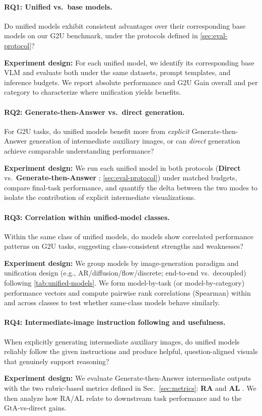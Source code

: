 \documentclass{article}
\theoremstyle{plain}
\theoremstyle{definition}
\theoremstyle{remark}
\begin{document}
\paragraph{RQ1: Unified vs.\ base models.}
Do unified models exhibit consistent advantages over their corresponding base models on our G2U benchmark, under the protocols defined in \cref{sec:eval-protocol}?
\par\noindent\textbf{Experiment design:} For each unified model, we identify its corresponding base VLM and evaluate both under the same datasets, prompt templates, and inference budgets. We report absolute performance and G2U Gain overall and per category to characterize where unification yields benefits.

\paragraph{RQ2: Generate-then-Answer  vs.\ direct generation.}
For G2U tasks, do unified models benefit more from \emph{explicit} Generate-then-Answer  generation of intermediate auxiliary images, or can \emph{direct} generation achieve comparable understanding performance?
\par\noindent\textbf{Experiment design:} We run each unified model in both protocols (\textbf{Direct} vs.\ \textbf{Generate-then-Answer }; \cref{sec:eval-protocol}) under matched budgets, compare final-task performance, and quantify the delta between the two modes to isolate the contribution of explicit intermediate visualizations.

\paragraph{RQ3: Correlation within unified-model classes.}
Within the same class of unified models, do models show correlated performance patterns on G2U tasks, suggesting class-consistent strengths and weaknesses?
\par\noindent\textbf{Experiment design:} We group models by image-generation paradigm and unification design (e.g., AR/diffusion/flow/discrete; end-to-end vs.\ decoupled) following \cref{tab:unified-models}. We form model-by-task (or model-by-category) performance vectors and compute pairwise rank correlations (Spearman) within and across classes to test whether same-class models behave similarly.

\paragraph{RQ4: Intermediate-image instruction following and usefulness.}
When explicitly generating intermediate auxiliary images, do unified models reliably follow the given instructions and produce helpful, question-aligned visuals that genuinely support reasoning?
\par\noindent\textbf{Experiment design:} We evaluate Generate-then-Answer  intermediate outputs with the two rubric-based metrics defined in Sec.~\ref{sec:metrics}: \textbf{RA}  and \textbf{AL} . We then analyze how RA/AL relate to downstream task performance and to the GtA-vs-direct gains.
\end{document}
